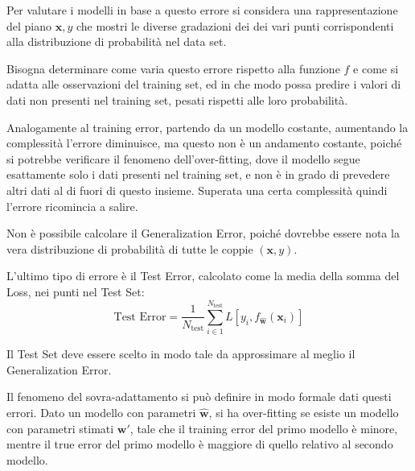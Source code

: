 \documentclass{article}
\numberwithin{equation}{subsection}
\newcommand{\vect}[1]{\boldsymbol{\mathbf{#1}}}
\begin{document}
Per valutare i modelli in base a questo errore si considera una rappresentazione 
del piano $\vect{x},y$ che mostri le diverse gradazioni dei dei vari punti corrispondenti 
alla distribuzione di probabilità nel data set. 

Bisogna determinare come varia questo errore rispetto alla funzione $f$ e come si 
adatta alle osservazioni del training set, ed in che modo possa predire i valori di dati 
non presenti nel training set, pesati rispetti alle loro probabilità. 

Analogamente al training error, partendo da un modello costante, aumentando la complessità 
l'errore diminuisce, ma questo non è un andamento costante, poiché si potrebbe 
verificare il fenomeno dell'over-fitting, dove il modello segue esattamente solo i dati presenti nel training set, e non è in grado di prevedere altri dati al di fuori di questo insieme. Superata una certa complessità quindi l'errore ricomincia a salire. 

Non è possibile calcolare il Generalization Error, poiché dovrebbe essere nota la vera distribuzione di probabilità di tutte le coppie $(\vect{x}, y)$. 

L'ultimo tipo di errore è il Test Error, calcolato come la media della somma del Loss, nei 
punti nel Test Set:
\begin{equation}
    \text{Test Error}=\displaystyle\frac{1}{N_\text{test}}\sum_{i\in1}^{N_{\text{test}}}L[y_i,f_{\vect{\hat{w}}}(\vect{x}_i)]
\end{equation}

Il Test Set deve essere scelto in modo tale da approssimare al meglio il Generalization Error. 

Il fenomeno del sovra-adattamento si può definire in modo formale dati questi errori. 
Dato un modello con parametri $\vect{\hat{w}}$, si ha over-fitting se esiste un modello con 
parametri stimati $\vect{w}'$, tale che il training error del primo modello è 
minore, mentre il true error del primo modello è maggiore di quello relativo al secondo 
modello. 
\end{document}
